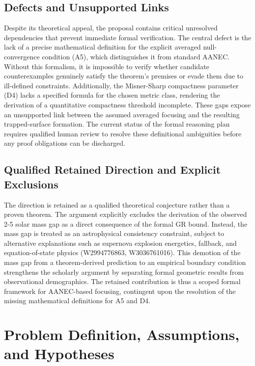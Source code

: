 \documentclass[conference]{IEEEtran}
\begin{document}
\subsection{Defects and Unsupported Links}
Despite its theoretical appeal, the proposal contains critical unresolved dependencies that prevent immediate formal verification. The central defect is the lack of a precise mathematical definition for the explicit averaged null-convergence condition (A5), which distinguishes it from standard AANEC. Without this formalism, it is impossible to verify whether candidate counterexamples genuinely satisfy the theorem's premises or evade them due to ill-defined constraints. Additionally, the Misner-Sharp compactness parameter (D4) lacks a specified formula for the chosen metric class, rendering the derivation of a quantitative compactness threshold incomplete. These gaps expose an unsupported link between the assumed averaged focusing and the resulting trapped-surface formation. The current status of the formal reasoning plan requires qualified human review to resolve these definitional ambiguities before any proof obligations can be discharged.

\subsection{Qualified Retained Direction and Explicit Exclusions}
The direction is retained as a qualified theoretical conjecture rather than a proven theorem. The argument explicitly excludes the derivation of the observed 2-5 solar mass gap as a direct consequence of the formal GR bound. Instead, the mass gap is treated as an astrophysical consistency constraint, subject to alternative explanations such as supernova explosion energetics, fallback, and equation-of-state physics (W2994776863, W3036761016). This demotion of the mass gap from a theorem-derived prediction to an empirical boundary condition strengthens the scholarly argument by separating formal geometric results from observational demographics. The retained contribution is thus a scoped formal framework for AANEC-based focusing, contingent upon the resolution of the missing mathematical definitions for A5 and D4.~\cite{cite_7a407c865faafd11,cite_f634820e22d7a238}

\section{Problem Definition, Assumptions, and Hypotheses}
\end{document}
